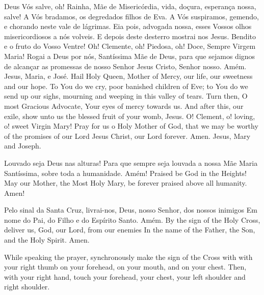   \beginverse
    Deus Vós salve, oh! Rainha, Mãe de Misericórdia,
    vida, doçura, esperança nossa, salve!
    \parspace
    A Vós bradamos, os degredados filhos de Eva.
    \parspace
    A Vós suspiramos, gemendo, e chorando neste vale de
    lágrimas.
    \parspace
    Eia pois, advogada nossa, esses Vossos olhos
    misericordiosos a nós volveis.
    \parspace
    E depois deste desterro mostrai nos Jesus.
    \parspace
    Bendito e o fruto do Vosso Ventre!
    \parspace
    Oh! Clemente, oh! Piedosa, oh! Doce, Sempre Virgem
    Maria!
    \parspace
    Rogai a Deus por nós, Santíssima Mãe de Deus, para
    que sejamos dignos de alcançar as promessas de nosso
    Senhor Jesus Cristo, Senhor nosso.
    \parspace
    Amém. Jesus, Maria, e José.
  \endverse
  \beginverse
    Hail Holy Queen, Mother of Mercy, our life, our
    sweetness and our hope.
    \parspace
    To You do we cry, poor banished children of Eve;
    \parspace
    to You do we send up our sighs, mourning and weeping
    in this valley of tears.
    \parspace
    Turn then, O most Gracious Advocate, Your eyes of
    mercy towards us.
    \parspace
    And after this, our exile, show unto us the blessed
    fruit of your womb, Jesus.
    \parspace
    O! Clement, o! loving, o! sweet Virgin Mary!
    \parspace
    Pray for us o Holy Mother of God, that we may be
    worthy of the promises of our Lord Jesus Christ,
    our Lord forever.
    \parspace
    Amen. Jesus, Mary and Joseph.
  \endverse
\endsong


  \beginverse
    Louvado seja Deus nas alturas!
    Para que sempre seja louvada
    a nossa Mãe Maria Santíssima,
    sobre toda a humanidade.
    Amém!
  \endverse
  \beginverse
    Praised be God in the Heights!
    May our Mother, the Most Holy Mary,
    be forever praised above all humanity.
    Amen!
  \endverse
\endsong


  \beginverse
    Pelo sinal da Santa Cruz,
    livrai-nos, Deus, nosso Senhor,
    dos nossos inimigos
    \parspace
    Em nome do Pai,
    do Filho e
    do Espírito Santo.
    \parspace
    Amém.
  \endverse
  \beginverse
    By the sign of the Holy Cross,
    deliver us, God, our Lord,
    from our enemies
    \parspace
    In the name of the Father,
    the Son, and
    the Holy Spirit.
    \parspace
    Amen.
  \endverse
  \begin{note}
    While speaking the prayer, synchronously make
    the sign of the Cross with with your right thumb
    on your forehead,
    on your mouth, and
    on your chest.
    \parspace
    Then, with your right hand, touch
    your forehead,
    your chest,
    your left shoulder and right shoulder.
  \end{note}
\endsong
